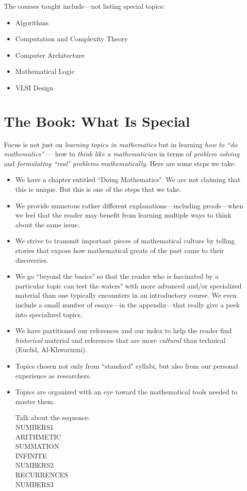 \documentclass{article}[12pt]
\begin{document}
The courses taught include---not listing special topics:
\begin{itemize}
\item
Algorithms
\item
Computation and Complexity Theory
\item
Computer Architecture
\item
Mathematical Logic
\item
VLSI Design
\end{itemize}

\section*{The Book: What Is Special}

Focus is not just on {\em learning topics in mathematics} but in learning {\em how to ``do mathematics"} --- how to {\em think like a mathematician} in terms of {\em problem solving} and {\em formulating ``real" problems mathematically}.  Here are some steps we take:
\begin{itemize}
\item
We have a chapter entitled ``Doing Mathematics".  We are not claiming that this is unique.  But this is one of the steps that we take.
\item
We provide numerous rather different explanations---including proofs---when we feel that the reader may benefit from learning multiple ways to think about the same issue.
\item
We strive to transmit important pieces of mathematical culture by telling stories that expose how mathematical greats of the past came to their discoveries.
\item
We go ``beyond the basics" so that the reader who is fascinated by a particular topic can 		test the waters" with more advanced and/or specialized material than one typically encounters in an introductory course.  We even include a small number of essays---in the appendix---that really give a peek into specialized topics.
\item
We have partitioned our references and our index to help the reader find {\em historical} material and references that are more {\em cultural} than technical (Euclid, Al-Khwarizmi).
\end{itemize}


\begin{itemize}
\item
Topics chosen not only from ``standard" syllabi, but also from our personal experience as researchers.
\item
Topics are organized with an eye toward the mathematical tools needed to master them.

Talk about the sequence: \\
NUMBERS1 \\
ARITHMETIC \\
SUMMATION \\
INFINITE \\
NUMBERS2 \\
RECURRENCES \\
NUMBERS3
\end{itemize}
\end{document}
